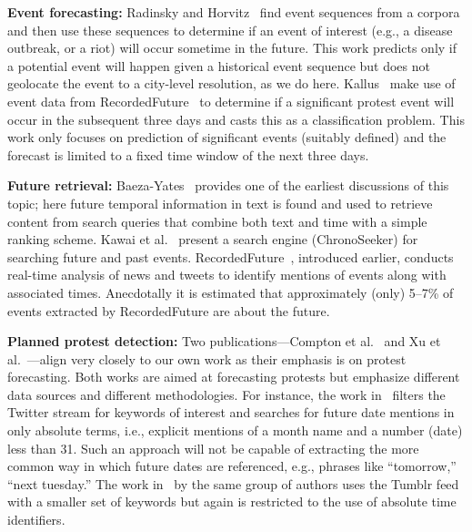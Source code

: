 \documentclass[letterpaper]{article}
\begin{document}
{\bf Event forecasting:} 
Radinsky and Horvitz~ find event sequences
from a corpora and then use these sequences to determine if an event of
interest (e.g., a disease outbreak, or a riot) will occur sometime in
the future. This work predicts only if a potential event will happen
given a historical event sequence but does not geolocate the event to a
city-level resolution, as we do here.  Kallus~
make use of event data from RecordedFuture~\cite{recordedFuture} to
determine if a  significant protest event will occur in the subsequent
three days and casts this as a classification problem.  This work only
focuses on prediction of significant events (suitably defined) and the
forecast is limited to a fixed time window of the next three days. 

{\bf Future retrieval:}
Baeza-Yates~ provides one of the earliest
discussions of this topic; here future temporal information in text is
found and used to retrieve content from search queries that combine both
text and time with a simple ranking scheme.  Kawai et
al.~ present a search engine (ChronoSeeker)
for searching future and past events.
RecordedFuture~\cite{recordedFuture}, introduced earlier, conducts
real-time analysis of news and tweets to identify mentions of events
along with associated times. Anecdotally it is estimated that
approximately (only) 5--7\% of events extracted by RecordedFuture are
about the future.

{\bf Planned protest detection:}
Two publications---Compton et al.~ and
Xu et al.~---align very closely to our own work
as their emphasis is on protest forecasting.  Both works are aimed at
forecasting protests but emphasize different data sources and different
methodologies. For instance, the work in~\cite{compton2013detecting}
filters the Twitter stream for keywords of interest and searches for
future date mentions in only absolute terms, i.e., explicit mentions of
a month name and a number (date) less than 31.  Such an approach will
not be capable of extracting the more common way in which future dates
are referenced, e.g., phrases like ``tomorrow,'' ``next tuesday.'' The
work in~\cite{xu2014civil} by the same group of authors uses the Tumblr
feed with a smaller set of keywords but again is restricted to the use
of absolute time identifiers.

\end{document}

